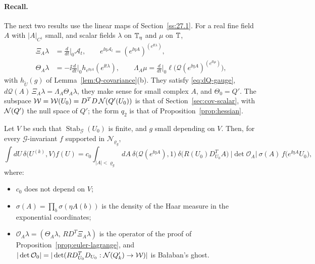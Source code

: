 \paragraph{Recall.} The next two results use the linear maps of Section~\ref{ss:27.1}. For a real fine field $A$ with $|A|_{C^1}$ small, and scalar fields $\lambda$ on $\mathbb T_\eta$ and $\mu$ on $\mathbb T$,
\[
\begin{aligned}
\Xi_A\lambda&=\tfrac{d}{dt}\Big|_{0}\mathcal A_t,\qquad e^{\ii\eta\mathcal A_t}=(e^{\ii\eta A})^{(e^{\ii t\lambda})},\\
\Theta_A\lambda&=-\ii\tfrac{d}{dt}\Big|_{0}h_{e^{\ii\eta A}}(e^{\ii t\lambda}),\qquad
\Lambda_A\mu=\tfrac{d}{dt}\Big|_0\ell\big(\mathcal Q(e^{\ii\eta A})^{(e^{\ii t\mu})}\big),
\end{aligned}
\]
with $h_{\tilde U}(g)$ of Lemma~\ref{lem:Q-covariance}(b). They satisfy \eqref{eq:dQ-gauge}, $d\mathcal Q(A)\,\Xi_A\lambda=\Lambda_A\Theta_A\lambda$, they make sense for small complex $A$, and $\Theta_0=Q'$. The subspace $\mathcal W=\mathcal W(U_0)=D^TD\,\mathcal N(Q'(U_0))$ is that of Section~\ref{sec:cov-scalar}, with $\mathcal N(Q')$ the null space of $Q'$; the form $q_2$ is that of Proposition~\ref{prop:hessian}.

\begin{proposition}\label{prop:ol-FP}
Let $V$ be such that $\operatorname{Stab}_{\mathcal G}(U_0)$ is finite, and $g$ small depending on $V$. Then, for every $\mathcal G$-invariant $f$ supported in $\mathscr N_{\varrho_g}$,
\[
\int dU\,\delta\big(U^{(k)},V\big)f(U)=c_0\int_{|A|<\varrho_g}dA\ \delta\big(\mathcal Q(e^{\ii\eta A}),1\big)\ \delta\big(R(U_0)D^T_{U_0}A\big)\ \big|\det\mathcal O_A\big|\ \sigma(A)\,f\big(e^{\ii\eta A}U_0\big),
\]
where:
\begin{itemize}
\item $c_0$ does not depend on $V$;
\item $\sigma(A)=\prod_b\sigma(\eta A(b))$ is the density of the Haar measure in the exponential coordinates;
\item $\mathcal O_A\lambda=(\Theta_A\lambda,\,RD^T\Xi_A\lambda)$ is the operator of the proof of Proposition~\ref{prop:euler-lagrange}, and $|\det\mathcal O_0|=|\det(RD^T_{U_0}D_{U_0}:\mathcal N(Q'_k)\to\mathcal W)|$ is Ba\l aban's ghost.
\end{itemize}
\end{proposition}

